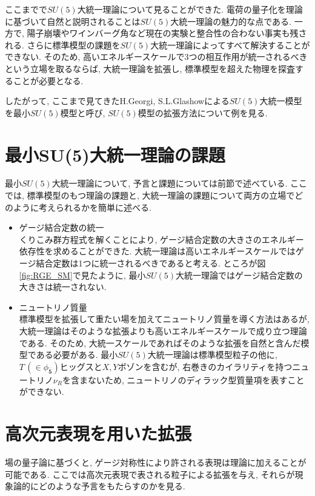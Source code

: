 %
%
ここまでで$SU(5)$大統一理論について見ることができた.
電荷の量子化を理論に基づいて自然と説明されることは$SU(5)$大統一理論の魅力的な点である.
一方で, 陽子崩壊やワインバーグ角など現在の実験と整合性の合わない事実も残される.
さらに標準模型の課題を$SU(5)$大統一理論によってすべて解決することができない.
そのため, 高いエネルギースケールで3つの相互作用が統一されるべきという立場を取るならば, 大統一理論を拡張し, 標準模型を超えた物理を探査することが必要となる.

したがって, ここまで見てきたH.Georgi, S.L.Glashowによる$SU(5)$大統一模型を最小$SU(5)$模型と呼び, $SU(5)$模型の拡張方法について例を見る.
\section{最小SU(5)大統一理論の課題}
最小$SU(5)$大統一理論について, 予言と課題については前節で述べている.
ここでは, 標準模型のもつ理論の課題と, 大統一理論の課題について両方の立場でどのように考えられるかを簡単に述べる.
\begin{itemize}
  \item ゲージ結合定数の統一\\
        くりこみ群方程式を解くことにより, ゲージ結合定数の大きさのエネルギー依存性を求めることができた.
        大統一理論は高いエネルギースケールではゲージ結合定数は1つに統一されるべきであると考える.
        ところが図\ref{fig:RGE_SM}で見たように, 最小$SU(5)$大統一理論ではゲージ結合定数の大きさは統一されない.
  \item ニュートリノ質量\\
        標準模型を拡張して重たい場を加えてニュートリノ質量を導く方法はあるが, 大統一理論はそのような拡張よりも高いエネルギースケールで成り立つ理論である.
        そのため, 大統一スケールであればそのような拡張を自然と含んだ模型である必要がある.
        最小$SU(5)$大統一理論は標準模型粒子の他に, $T \,(\in \phi_{\bar{\bm{5}}})$ヒッグスと$X,Y$ボゾンを含むが, 右巻きのカイラリティを持つニュートリノ$\nu_R$を含まないため, ニュートリノのディラック型質量項を表すことができない. 
\end{itemize}
\section{高次元表現を用いた拡張}
場の量子論に基づくと, ゲージ対称性により許される表現は理論に加えることが可能である.
ここでは高次元表現で表される粒子による拡張を与え, それらが現象論的にどのような予言をもたらすのかを見る.
